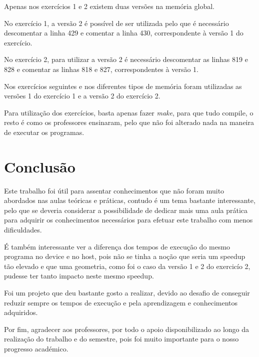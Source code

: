 \documentclass[pdftex,12pt,a4paper]{report}
\begin{document}
Apenas nos exercícios 1 e 2 existem duas versões na memória global.

No exercício 1, a versão 2 é possível de ser utilizada pelo que é necessário descomentar a linha 429 e comentar a linha 430, correspondente à versão 1 do exercício.

No exercício 2, para utilizar a versão 2 é necessário descomentar as linhas 819 e 828 e comentar as linhas 818 e 827, correspondentes à versão 1.

Nos exercícios seguintes e nos diferentes tipos de memória foram utilizadas as versões 1 do exercício 1 e a versão 2 do exercício 2. 

Para utilização dos exercícios, basta apenas fazer \textit{make}, para que tudo compile, o resto é como os professores ensinaram, pelo que não foi alterado nada na maneira de executar os programas.

\newpage
\section{Conclusão}

Este trabalho foi útil para assentar conhecimentos que não foram muito abordados nas aulas teóricas e práticas, contudo é um tema bastante interessante, pelo que se deveria considerar a possibilidade de dedicar mais uma aula prática para adquirir os conhecimentos necessários para efetuar este trabalho com menos dificuldades.

É também interessante ver a diferença dos tempos de execução do mesmo programa no device e no host, pois não se tinha a noção que seria um speedup tão elevado e que uma geometria, como foi o caso da versão 1 e 2 do exercicío 2, pudesse ter tanto impacto neste mesmo speedup.

Foi um projeto que deu bastante gosto a realizar, devido ao desafio de conseguir reduzir sempre os tempos de execução e pela aprendizagem e conhecimentos adquiridos.

Por fim, agradecer aos professores, por todo o apoio disponibilizado ao longo da realização do trabalho e do semestre, pois foi muito importante para o nosso progresso académico.
\end{document}
